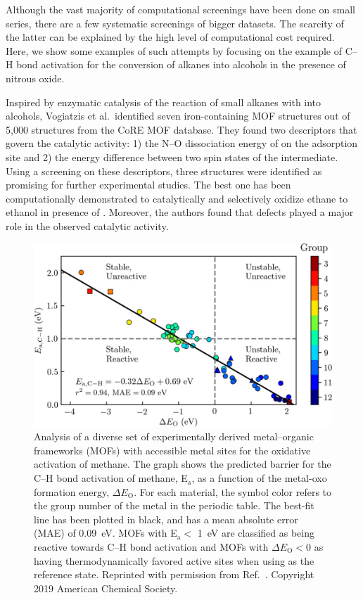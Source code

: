 \documentclass[main.tex]{subfiles}
\begin{document}
Although the vast majority of computational screenings have been done on small series, there are a few systematic screenings of bigger datasets. The scarcity of the latter can be explained by the high level of computational cost required. Here, we show some examples of such attempts by focusing on the example of C--H bond activation for the conversion of alkanes into alcohols in the presence of nitrous oxide.

Inspired by enzymatic catalysis of the reaction of small alkanes with  into alcohols, Vogiatzis et al.\ identified  seven iron-containing MOF structures out of 5,000 structures from the CoRE MOF database.\cite{Vogiatzis_2016} They found two descriptors that govern the catalytic activity: 1) the N--O dissociation energy of  on the adsorption site and 2) the energy difference between two spin states of the intermediate.
Using a screening on these descriptors, three structures were identified as promising for further experimental studies. The best one has been computationally demonstrated to catalytically and selectively oxidize ethane to ethanol in presence of . Moreover, the authors found that defects played a major role in the observed catalytic activity.

\begin{figure}[ht]
\centering
  \includegraphics[width=0.8\linewidth]{figures/1-screening/Rosen_2019.jpeg}
  \caption{Analysis of a diverse set of experimentally derived metal--organic frameworks (MOFs) with accessible metal sites for the oxidative activation of methane. The graph shows the predicted barrier for the C--H bond activation of methane, E$_\text{a}$, as a function of the metal-oxo formation energy, $\Delta E_\text{O}$. For each material, the symbol color refers to the group number of the metal in the periodic table. The best-fit line has been plotted in black, and has a mean absolute error (MAE) of \SI{0.09}{\eV}. MOFs with E$_\text{a}<$ \SI{1}{\eV} are classified as being reactive towards C--H bond activation and MOFs with $\Delta E_\text{O}<0$ as having thermodynamically favored active sites when using  as the reference state. Reprinted with permission from Ref.~. Copyright 2019 American Chemical Society.}
  \label{fgr:Rosen_2019}
\end{figure}
\end{document}
